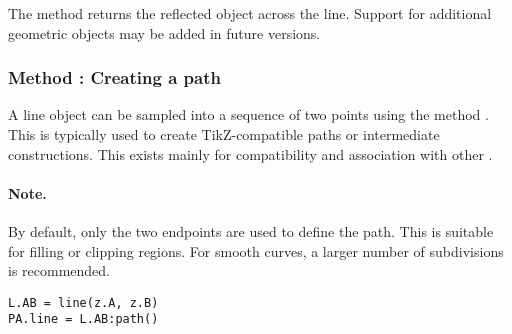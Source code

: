 \noindent
The method returns the reflected object across the line. Support for additional geometric objects may be added in future versions.

\vspace{1em}

\begin{tkzexample}[latex=.5\textwidth]

\begin{center}
\end{center}
\end{tkzexample}


\subsubsection{Method : Creating a path} %
\label{ssub:line_path}

A line object can be sampled into a sequence of two points using the method . This is typically used to create TikZ-compatible paths or intermediate constructions. This 
exists mainly for compatibility and association with other .
\medskip

\paragraph{Note.}
By default, only the two endpoints are used to define the path. This is suitable for filling or clipping regions. For smooth curves, a larger number of subdivisions is recommended.

\medskip

\begin{mybox}
\begin{verbatim}
L.AB = line(z.A, z.B)
PA.line = L.AB:path()
\end{verbatim}
\end{mybox}

